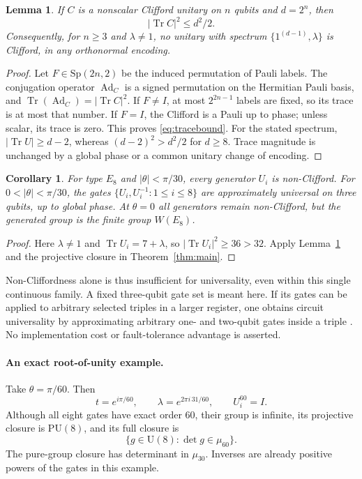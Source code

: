 \documentclass[11pt,a4paper]{article}
\newtheorem{lemma}[theorem]{Lemma}
\newtheorem{corollary}[theorem]{Corollary}
\theoremstyle{remark}\newtheorem{remark}[theorem]{Remark}
\newcommand{\U}{\mathrm U}
\newcommand{\PU}{\mathrm {PU}}
\newcommand{\Tr}{\operatorname{Tr}}
\begin{document}
\begin{lemma}\label{lem:clifford}
If $C$ is a nonscalar Clifford unitary on $n$ qubits and $d=2^n$, then
\begin{equation}\label{eq:tracebound}
 |\Tr C|^2\leq d^2/2.
\end{equation}
Consequently, for $n\geq3$ and $\lambda\ne1$, no unitary with spectrum
$\{1^{(d-1)},\lambda\}$ is Clifford, in any orthonormal encoding.
\end{lemma}
\begin{proof}
Let $F\in\mathrm{Sp}(2n,2)$ be the induced permutation of Pauli labels.
The conjugation operator $\operatorname{Ad}_C$ is a signed permutation
on the Hermitian Pauli basis, and
$\Tr(\operatorname{Ad}_C)=|\Tr C|^2$.
If $F\ne I$, at most $2^{2n-1}$ labels are fixed, so its trace is at most
that number.  If $F=I$, the Clifford is a Pauli up to phase; unless
scalar, its trace is zero.  This proves \eqref{eq:tracebound}.
For the stated spectrum,
$|\Tr U|\geq d-2$, whereas $(d-2)^2>d^2/2$ for $d\geq8$.
Trace magnitude is unchanged by a global phase or a common unitary
change of encoding.
\end{proof}

\begin{corollary}\label{cor:e8}
For type $E_8$ and $|\theta|<\pi/30$, every generator $U_i$ is
non-Clifford.  For $0<|\theta|<\pi/30$, the gates
$\{U_i,U_i^{-1}:1\leq i\leq8\}$ are approximately universal on three
qubits, up to global phase.  At $\theta=0$ all generators remain
non-Clifford, but the generated group is the finite group $W(E_8)$.
\end{corollary}
\begin{proof}
Here $\lambda\ne1$ and $\Tr U_i=7+\lambda$, so
$|\Tr U_i|^2\geq36>32$.  Apply Lemma~\ref{lem:clifford} and the
projective closure in Theorem~\ref{thm:main}.
\end{proof}

Non-Cliffordness alone is thus insufficient for universality, even within
this single continuous family.  A fixed three-qubit gate set is meant
here.  If its gates can be applied to arbitrary selected triples in a
larger register, one obtains circuit universality by approximating arbitrary
one- and two-qubit gates inside a triple \cite{Barenco}.  No implementation cost or
fault-tolerance advantage is asserted.

\paragraph{An exact root-of-unity example.}
Take $\theta=\pi/60$.  Then
\[
 t=e^{i\pi/60},\qquad \lambda=e^{2\pi i\,31/60},\qquad U_i^{60}=I.
\]
Although all eight gates have exact order $60$, their group is infinite,
its projective closure is $\PU(8)$, and its full closure is
\[
 \{g\in\U(8):\det g\in\mu_{60}\}.
\]
The pure-group closure has determinant in $\mu_{30}$.  Inverses are
already positive powers of the gates in this example.
\end{document}
